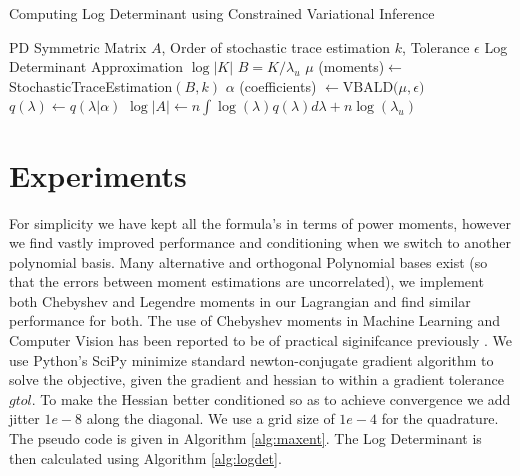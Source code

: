 \documentclass[letterpaper]{article} %
\begin{document}
\begin{algorithm}
	\caption{Computing Log Determinant using Constrained Variational Inference}\label{alg:logdet}
	\begin{algorithmic}[1]
		\vspace{0.5em}
		 PD Symmetric Matrix $A$, Order of stochastic trace estimation $k$, Tolerance $\epsilon$
		 Log Determinant Approximation $\log|K|$
		\STATE $B = K/\lambda_{u}$
		\STATE $\mu$ (moments)$ \gets$ StochasticTraceEstimation$(B, k)$ 
		\STATE $\alpha$ (coefficients) $\gets \text{VBALD(}\mu, \epsilon)$
		\STATE $q(\lambda) \gets q(\lambda | \alpha)$
		\STATE $\log|A| \gets n\int \log(\lambda) q(\lambda) d\lambda + n\log(\lambda_{u})$
	\end{algorithmic}
\end{algorithm}

\section{Experiments}
\label{experiments}
For simplicity we have kept all the formula's in terms of power moments, however we find vastly improved performance and conditioning when we switch to another polynomial basis. Many alternative and orthogonal Polynomial bases exist (so that the errors between moment estimations are uncorrelated), we implement both Chebyshev and Legendre moments in our Lagrangian and find similar performance for both. The use of Chebyshev moments in Machine Learning and Computer Vision has been reported to be of practical siginifcance previously \cite{yap2001chebyshev}. We use Python's SciPy minimize standard newton-conjugate gradient algorithm to solve the objective, given the gradient and hessian to within a gradient tolerance $gtol$. To make the Hessian better conditioned so as to achieve convergence we add jitter $1e-8$ along the diagonal. We use a grid size of $1e-4$ for the quadrature. The pseudo code is given in Algorithm \ref{alg:maxent}. The Log Determinant is then calculated using Algorithm \ref{alg:logdet}.
\end{document}
